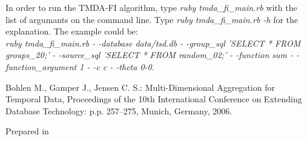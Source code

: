 \documentclass[a4paper,11pt]{article}
\begin{document}
In order to run the TMDA-FI algorithm, type \textit{ruby tmda\_fi\_main.rb} with the list of argumants on the command line. Type \textit{ruby tmda\_fi\_main.rb -h} for the explanation. The example could be:\\ \textit{ruby tmda\_fi\_main.rb - -database data/tsd.db - -group\_sql 'SELECT * FROM groups\_20;' - -source\_sql 'SELECT * FROM random\_02;' - -function sum - -function\_argument 1 - -c c - -theta 0-0}.


\begin{thebibliography}{9999}
Bohlen M., Gamper J., Jensen C. S.: Multi-Dimensional Aggregation for Temporal Data,
Proceedings of the 10th International Conference on Extending Database Technology: p.p. 257–275, Munich, Germany, 2006.
\end{thebibliography}
\vfill
\begin{flushright}\small Prepared in \LaTeXe\ \end{flushright}
\end{document}
